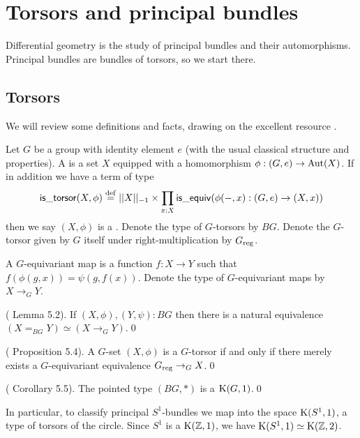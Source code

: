 \section{Torsors and principal bundles}
\label{sec:torsors}
Differential geometry is the study of principal bundles and their automorphisms. Principal bundles are bundles of torsors, so we start there.

\subsection{Torsors}
\label{subsec:torsors}
We will review some definitions and facts, drawing on the excellent resource \cite{buchholtz2023central}.

\begin{mydef}
Let \( G \) be a group with identity element \( e \) (with the usual classical structure and properties). A  is a set \( X \) equipped with a homomorphism \( \phi:(G,e)\to\operatorname{Aut}(X) \). If in addition we have a term of type
\[ 
\mathsf{is\_torsor}(X,\phi)\stackrel{\mathrm{def}}{=} ||X||_{-1}\times \prod_{x:X}\mathsf{is\_equiv}(\phi(-,x):(G,e)\to (X,x))
\] then we say \( (X,\phi) \) is a . Denote the type of \( G \)-torsors by \( BG \). Denote the \( G \)-torsor given by \( G \) itself under right-multiplication by \( {G}_\mathrm{reg} \).
\end{mydef}

A \( G \)-equivariant map is a function \( f:X\to Y \) such that \( f(\phi(g,x))=\psi(g,f(x)) \). Denote the type of \( G \)-equivariant maps by \( X\to_G Y \).

\begin{mylemma}
(\cite{buchholtz2023central} Lemma 5.2). If \( (X,\phi),(Y,\psi):BG \) then there is a natural equivalence \( (X=_{BG}Y) \simeq (X\to_G Y) \).\qed
\end{mylemma}

\begin{mylemma}
(\cite{buchholtz2023central} Proposition 5.4). A \( G \)-set \( (X,\phi) \) is a \( G \)-torsor if and only if there merely exists a \( G \)-equivariant equivalence \( {G}_\mathrm{reg}\to_G X \).\qed
\end{mylemma}

\begin{mycor}
(\cite{buchholtz2023central} Corollary 5.5). The pointed type \( (BG,*) \) is a \( \mathrm{K}(G,1) \).\qed
\end{mycor}

In particular, to classify principal \( S^1 \)-bundles we map into the space \( \mathrm{K}(S^1, 1) \), a type of torsors of the circle. Since \( S^1 \) is a \( \mathrm{K}(\mathbb{Z},1) \), we have \( \mathrm{K}(S^1,1)\simeq\mathrm{K}(\mathbb{Z},2) \).

